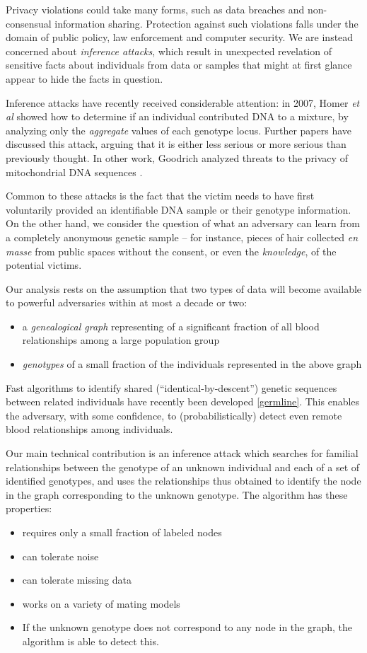 \documentclass{article}
\begin{document}
Privacy violations could take many forms, such as data breaches and non-consensual information sharing. Protection against such violations falls under the domain of public policy, law enforcement and computer security. We are instead concerned about {\em inference attacks}, which result in unexpected revelation of sensitive facts about individuals from data or samples that might at first glance appear to hide the facts in question.

Inference attacks have recently received considerable attention: in 2007, Homer {\em et al} showed how to determine  if an individual contributed DNA to a mixture, by analyzing only the {\em aggregate} values of each genotype locus. Further papers have discussed this attack, arguing that it is either less serious \cite{sriram} or more serious \cite{css} than previously thought.  In other work, Goodrich analyzed threats to the privacy of mitochondrial DNA sequences \cite{goodrich}.

Common to these attacks is the fact that the victim needs to have first voluntarily provided an identifiable DNA sample or their genotype information. On the other hand, we consider the question of what an adversary can learn from a completely anonymous genetic sample -- for instance, pieces of hair collected {\em en masse} from public spaces without the consent, or even the {\em knowledge}, of the potential victims.

 Our analysis rests on the assumption that two types of data will become available to powerful adversaries within at most a decade or two: 
\begin{itemize}
\item
a {\em genealogical graph} representing of a significant fraction of all blood relationships among a large population group
\item
{\em genotypes} of a small fraction of the individuals represented in the above graph
\end{itemize}

Fast algorithms to identify shared (``identical-by-descent'') genetic sequences between related individuals have recently been developed \ref{germline}. This enables the adversary, with some confidence, to (probabilistically) detect even remote blood relationships among individuals.

Our main technical contribution is an inference attack which searches for familial relationships between the genotype of an unknown individual and each of a set of identified genotypes, and uses the relationships thus obtained to identify the node in the graph corresponding to the unknown genotype. The algorithm has these properties:
\begin{itemize}
\item
requires only a small fraction of labeled nodes
\item
can tolerate noise
\item
can tolerate missing data
\item
works on a variety of mating models
\item
If the unknown genotype does not correspond to any node in the graph, the  algorithm is able to detect this.
\end{itemize}
\end{document}
